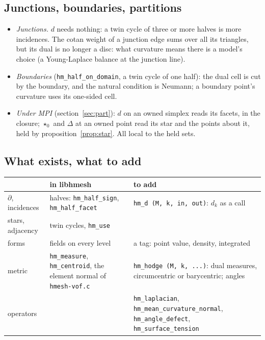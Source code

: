 \documentclass[10pt,a4paper]{article}
\theoremstyle{definition}
\newcommand{\fn}[1]{\texttt{#1}}
\begin{document}
\subsection{Junctions, boundaries, partitions}

\begin{itemize}
  \item \emph{Junctions.} $d$ needs nothing: a twin cycle of three or more
    halves is more incidences. The cotan weight of a junction edge sums
    over all its triangles, but its dual is no longer a disc: what
    curvature means there is a model's choice (a Young-Laplace balance at
    the junction line).
  \item \emph{Boundaries} (\fn{hm\_half\_on\_domain}, a twin cycle of one
    half): the dual cell is cut by the boundary, and the natural condition
    is Neumann; a boundary point's curvature uses its one-sided cell.
  \item \emph{Under MPI} (section~\ref{sec:part}): $d$ on an owned simplex
    reads its facets, in the closure; $\star_0$ and $\Delta$ at an owned
    point read its star and the points about it, held by
    proposition~\ref{prop:star}. All local to the held sets.
\end{itemize}

\subsection{What exists, what to add}

\begin{center}
\small
\begin{tabularx}{\textwidth}{@{}l >{\raggedright}p{}X@{}}
  \toprule
  & in libhmesh & to add \\
  \midrule
  $\partial$, incidences & halves: \fn{hm\_half\_sign},
    \fn{hm\_half\_facet} & \fn{hm\_d (M, k, in, out)}: $d_k$ as a call \\
  stars, adjacency & twin cycles, \fn{hm\_use} & \\
  forms & fields on every level & a tag: point value, density,
    integrated \\
  metric & \fn{hm\_measure}, \fn{hm\_centroid}, the element normal of
    \fn{hmesh-vof.c} & \fn{hm\_hodge (M, k, ...)}: dual measures,
    circumcentric or barycentric; angles \\
  operators & & \fn{hm\_laplacian}, \fn{hm\_mean\_curvature\_normal},
    \fn{hm\_angle\_defect}, \fn{hm\_surface\_tension} \\
  \bottomrule
\end{tabularx}
\end{center}
\end{document}
